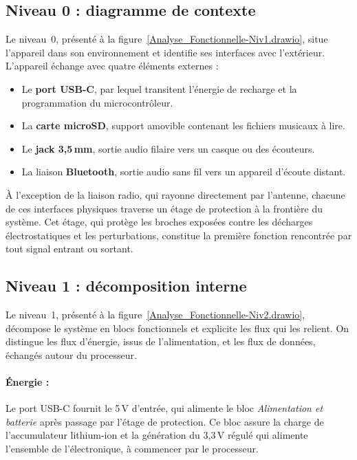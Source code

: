 \subsection{Niveau 0 : diagramme de contexte}
Le niveau~0, présenté à la figure~\ref{Analyse_Fonctionnelle-Niv1.drawio}, situe l'appareil dans son environnement et identifie ses interfaces avec l'extérieur. L'appareil échange avec quatre éléments externes :
\begin{itemize}
      \item Le \textbf{port USB-C}, par lequel transitent l'énergie de recharge et la programmation du microcontrôleur.
      \item La \textbf{carte microSD}, support amovible contenant les fichiers musicaux à lire.
      \item Le \textbf{jack 3,5\,mm}, sortie audio filaire vers un casque ou des écouteurs.
      \item La liaison \textbf{Bluetooth}, sortie audio sans fil vers un appareil d'écoute distant.
\end{itemize}
À l'exception de la liaison radio, qui rayonne directement par l'antenne, chacune de ces interfaces physiques traverse un étage de protection à la frontière du système. Cet étage, qui protège les broches exposées contre les décharges électrostatiques et les perturbations, constitue la première fonction rencontrée par tout signal entrant ou sortant.


\clearpage
\subsection{Niveau 1 : décomposition interne}
Le niveau~1, présenté à la figure~\ref{Analyse_Fonctionnelle-Niv2.drawio}, décompose le système en blocs fonctionnels et explicite les flux qui les relient. On distingue les flux d'énergie, issus de l'alimentation, et les flux de données, échangés autour du processeur.

\paragraph{Énergie :} Le port USB-C fournit le 5\,V d'entrée, qui alimente le bloc \emph{Alimentation et batterie} après passage par l'étage de protection. Ce bloc assure la charge de l'accumulateur lithium-ion et la génération du 3,3\,V régulé qui alimente l'ensemble de l'électronique, à commencer par le processeur.

